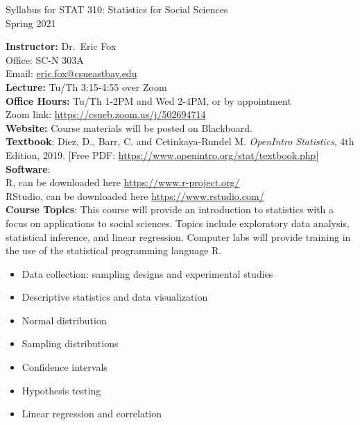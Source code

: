 \documentclass[12pt]{report}
\newenvironment{myitemize}
{ \begin{itemize}
    \setlength{\itemsep}{5pt}
    \setlength{\parskip}{0pt}
    \setlength{\parsep}{0pt}     }
{ \end{itemize}                  }
\begin{document}
\setlength\parindent{0pt}

\begin{center}
\large
Syllabus for STAT 310: Statistics for Social Sciences\\
\large
Spring 2021\\   
\end{center}
\vspace{10pt}

\normalsize
\textbf{Instructor:} Dr.~Eric Fox\\ 
Office: SC-N 303A\\ 
Email: \url{eric.fox@csueastbay.edu}\\

\textbf{Lecture:} Tu/Th 3:15-4:55 over Zoom\\

\textbf{Office Hours:} Tu/Th 1-2PM and Wed 2-4PM, or by appointment\\
Zoom link: \url{https://csueb.zoom.us/j/502694714}\\

\textbf{Website:} Course materials will be posted on Blackboard.\\ 

\textbf{Textbook}:  Diez, D., Barr, C. and Cetinkaya-Rundel M. \emph{OpenIntro Statistics}, 4th Edition, 2019. [Free PDF: \url{https://www.openintro.org/stat/textbook.php}]\\

\textbf{Software}:\\ 
R, can be downloaded here \url{https://www.r-project.org/}\\
RStudio, can be downloaded here \url{https://www.rstudio.com/}\\ 

\textbf{Course Topics}:  This course will provide an introduction to statistics with a focus on applications to social sciences. Topics include exploratory data analysis, statistical inference, and linear regression.  Computer labs will provide training in the use of the statistical programming language R.
\begin{myitemize}
\item Data collection: sampling designs and experimental studies
\item Descriptive statistics and data visualization
\item Normal distribution
\item Sampling distributions 
\item Confidence intervals 
\item Hypothesis testing
\item Linear regression and correlation\\
\end{myitemize}
\end{document}
